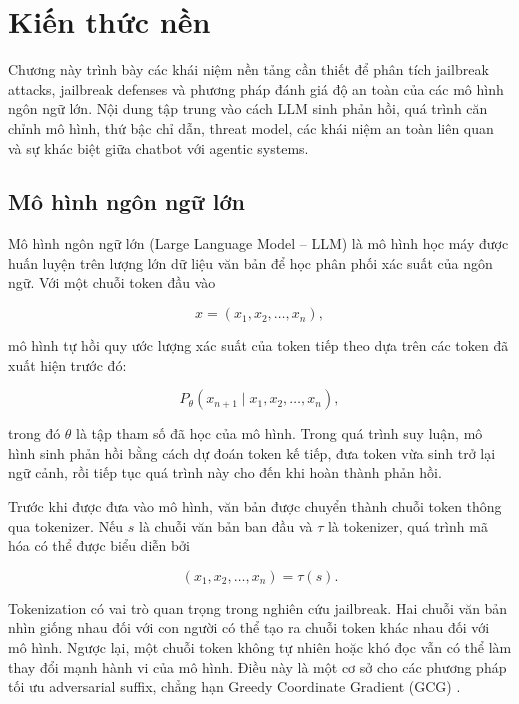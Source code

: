 \section{Kiến thức nền}
\label{sec:background}

Chương này trình bày các khái niệm nền tảng cần thiết để phân tích
jailbreak attacks, jailbreak defenses và phương pháp đánh giá độ an toàn
của các mô hình ngôn ngữ lớn. Nội dung tập trung vào cách LLM sinh phản
hồi, quá trình căn chỉnh mô hình, thứ bậc chỉ dẫn, threat model, các khái
niệm an toàn liên quan và sự khác biệt giữa chatbot với agentic systems.

\subsection{Mô hình ngôn ngữ lớn}
\label{subsec:large-language-models}

Mô hình ngôn ngữ lớn (Large Language Model -- LLM) là mô hình học máy
được huấn luyện trên lượng lớn dữ liệu văn bản để học phân phối xác suất
của ngôn ngữ. Với một chuỗi token đầu vào

\begin{equation}
    x = (x_1, x_2, \ldots, x_n),
\end{equation}

mô hình tự hồi quy ước lượng xác suất của token tiếp theo dựa trên các
token đã xuất hiện trước đó:

\begin{equation}
    P_{\theta}(x_{n+1} \mid x_1, x_2, \ldots, x_n),
    \label{eq:next-token-probability}
\end{equation}

trong đó $\theta$ là tập tham số đã học của mô hình. Trong quá trình suy
luận, mô hình sinh phản hồi bằng cách dự đoán token kế tiếp, đưa token
vừa sinh trở lại ngữ cảnh, rồi tiếp tục quá trình này cho đến khi hoàn
thành phản hồi.

Trước khi được đưa vào mô hình, văn bản được chuyển thành chuỗi token
thông qua tokenizer. Nếu $s$ là chuỗi văn bản ban đầu và $\tau$ là
tokenizer, quá trình mã hóa có thể được biểu diễn bởi

\begin{equation}
    (x_1, x_2, \ldots, x_n) = \tau(s).
\end{equation}

Tokenization có vai trò quan trọng trong nghiên cứu jailbreak. Hai chuỗi
văn bản nhìn giống nhau đối với con người có thể tạo ra chuỗi token khác
nhau đối với mô hình. Ngược lại, một chuỗi token không tự nhiên hoặc khó
đọc vẫn có thể làm thay đổi mạnh hành vi của mô hình. Điều này là một cơ
sở cho các phương pháp tối ưu adversarial suffix, chẳng hạn Greedy
Coordinate Gradient (GCG) \cite{zou2023universal}.

